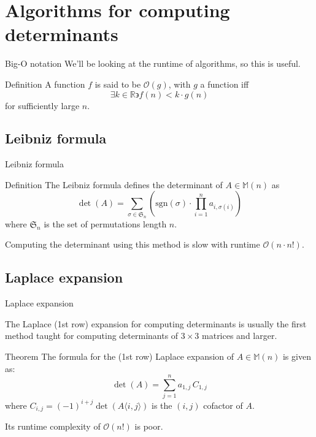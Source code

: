 \documentclass{beamer}
\begin{document}
\section{Algorithms for computing determinants}

\begin{frame}{Big-O notation}
    We'll be looking at the runtime of algorithms, so this is useful.

    \begin{block}{Definition}
        A function $f$ is said to be $\mathcal{O}(g)$, with $g$ a function iff
        \[
            \exists k \in \mathbb{R} \backepsilon f(n) < k \cdot g(n)
        \]
        for sufficiently large $n$.
    \end{block}

\end{frame}

\subsection{Leibniz formula}

\begin{frame}{Leibniz formula}

    \begin{block}{Definition}
        The Leibniz formula defines the determinant of $A \in \mathbb{M}(n)$ as
        \[
            \det(A) = \sum_{\sigma \in \mathfrak{S}_n}
            \left( \text{sgn}(\sigma) \cdot \prod_{i=1}^n a_{i,\sigma(i)} \right)
        \]
        where $\mathfrak{S}_n$ is the set of permutations length $n$.
    \end{block}

    \pause{}

    Computing the determinant using this method is slow with runtime $\mathcal{O}(n\cdot n!)$.

\end{frame}

\subsection{Laplace expansion}

\begin{frame}{Laplace expansion}

    The Laplace (1st row) expansion for computing determinants is usually the first method taught
    for computing determinants of $3 \times 3$ matrices and larger.

    \pause{}

    \begin{block}{Theorem}
        The formula for the (1st row) Laplace expansion of $A \in \mathbb{M}(n)$
        is given as:
        \[
            \det(A) = \sum_{j=1}^n a_{1,j}\, C_{1,j}
        \]
        where $C_{i,j} = {(-1)}^{i+j} \det{(A \langle i, j \rangle)}$ is the
        $(i, j)$ cofactor of $A$.
    \end{block}

    \pause{}

    Its runtime complexity of $\mathcal{O}(n!)$ is poor.

\end{frame}
\end{document}

